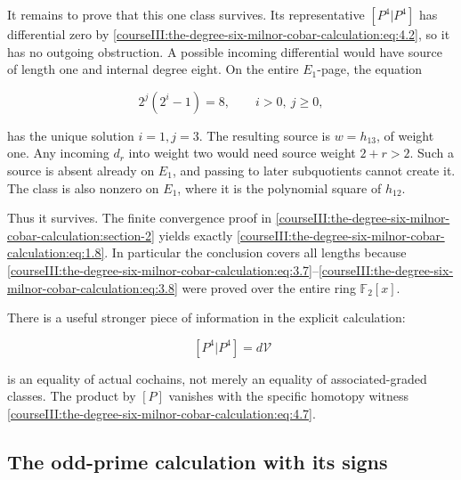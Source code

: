 It remains to prove that this one class survives. Its representative \([P^4|P^4]\) has differential zero by \eqref{courseIII:the-degree-six-milnor-cobar-calculation:eq:4.2}, so it has no outgoing obstruction. A possible incoming differential would have source of length one and internal degree eight. On the entire \(E_1\)-page, the equation

\begin{equation}
2^j(2^i-1)=8,\qquad i>0,\ j\geq0,
 \label{courseIII:the-degree-six-milnor-cobar-calculation:eq:5.3}
\end{equation}

has the unique solution \(i=1,j=3\). The resulting source is \(w=h_{13}\), of weight one. Any incoming \(d_r\) into weight two would need source weight \(2+r>2\). Such a source is absent already on \(E_1\), and passing to later subquotients cannot create it. The class is also nonzero on \(E_1\), where it is the polynomial square of \(h_{12}\).

Thus it survives. The finite convergence proof in \cref{courseIII:the-degree-six-milnor-cobar-calculation:section-2} yields exactly \eqref{courseIII:the-degree-six-milnor-cobar-calculation:eq:1.8}. In particular the conclusion covers all lengths because \eqref{courseIII:the-degree-six-milnor-cobar-calculation:eq:3.7}--\eqref{courseIII:the-degree-six-milnor-cobar-calculation:eq:3.8} were proved over the entire ring \(\mathbb F _2[x]\).

There is a useful stronger piece of information in the explicit calculation:

\begin{equation}
[P]\,[P^4|P^4]=d\mathcal V
 \label{courseIII:the-degree-six-milnor-cobar-calculation:eq:5.4}
\end{equation}

is an equality of actual cochains, not merely an equality of associated-graded classes. The product by \([P]\) vanishes with the specific homotopy witness \eqref{courseIII:the-degree-six-milnor-cobar-calculation:eq:4.7}.

\label{courseIII:the-degree-six-milnor-cobar-calculation:six-cobar-odd-primes}

\subsection{The odd-prime calculation with its signs}
\label{courseIII:the-degree-six-milnor-cobar-calculation:section-6}

\label{courseIII:milnor-cobar:6.1}

